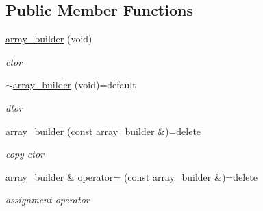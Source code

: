 \subsection*{Public Member Functions}
\begin{DoxyCompactItemize}
\item 
\mbox{\label{classcpp__redis_1_1builders_1_1array__builder_a4beae33a547d3d7efc112659411a23a3}} 
\mbox{\hyperlink{classcpp__redis_1_1builders_1_1array__builder_a4beae33a547d3d7efc112659411a23a3}{array\+\_\+builder}} (void)
\begin{DoxyCompactList}\small\item\em ctor \end{DoxyCompactList}\item 
\mbox{\label{classcpp__redis_1_1builders_1_1array__builder_ae6a0cd0743b6b0a21f9c3d44fd31ac17}} 
\mbox{\hyperlink{classcpp__redis_1_1builders_1_1array__builder_ae6a0cd0743b6b0a21f9c3d44fd31ac17}{$\sim$array\+\_\+builder}} (void)=default
\begin{DoxyCompactList}\small\item\em dtor \end{DoxyCompactList}\item 
\mbox{\label{classcpp__redis_1_1builders_1_1array__builder_aa0e5fe9a587b277a473d66b7e6db9548}} 
\mbox{\hyperlink{classcpp__redis_1_1builders_1_1array__builder_aa0e5fe9a587b277a473d66b7e6db9548}{array\+\_\+builder}} (const \mbox{\hyperlink{classcpp__redis_1_1builders_1_1array__builder}{array\+\_\+builder}} \&)=delete
\begin{DoxyCompactList}\small\item\em copy ctor \end{DoxyCompactList}\item 
\mbox{\label{classcpp__redis_1_1builders_1_1array__builder_aaa1df845df7a007cf73f95f73e800c2c}} 
\mbox{\hyperlink{classcpp__redis_1_1builders_1_1array__builder}{array\+\_\+builder}} \& \mbox{\hyperlink{classcpp__redis_1_1builders_1_1array__builder_aaa1df845df7a007cf73f95f73e800c2c}{operator=}} (const \mbox{\hyperlink{classcpp__redis_1_1builders_1_1array__builder}{array\+\_\+builder}} \&)=delete
\begin{DoxyCompactList}\small\item\em assignment operator \end{DoxyCompactList}\item 

\end{DoxyCompactItemize}
